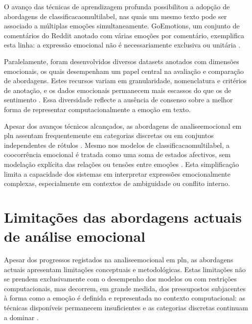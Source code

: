 O avanço das técnicas de aprendizagem profunda possibilitou a adopção de abordagens de \gls{classificacaomultilabel}, nas quais um mesmo texto pode ser associado a múltiplas emoções simultaneamente. GoEmotions, um conjunto de comentários do Reddit anotado com várias emoções por comentário, exemplifica esta linha: a expressão emocional não é necessariamente exclusiva ou unitária \parencite{Demszky2020GoEmotions}.

Paralelamente, foram desenvolvidos diversos datasets anotados com dimensões emocionais, os quais desempenham um papel central na avaliação e comparação de abordagens. Estes recursos variam em granularidade, nomenclatura e critérios de anotação, e os dados emocionais permanecem mais escassos do que os de sentimento \parencite{PlazaDelArco2024Trends, Seyeditabari2018Review}. Essa diversidade reflecte a ausência de consenso sobre a melhor forma de representar computacionalmente a emoção em texto.

Apesar dos avanços técnicos alcançados, as abordagens de \gls{analiseemocional} em \gls{pln} assentam frequentemente em categorias discretas ou em conjuntos independentes de rótulos \parencite{PlazaDelArco2024Trends, Seyeditabari2018Review}. Mesmo nos modelos de \gls{classificacaomultilabel}, a coocorrência emocional é tratada como uma soma de estados afectivos, sem modelação explícita das relações ou tensões entre emoções \parencite{Singh2026MultiEmotionIntensity, Zhao2026MEGE}. Esta simplificação limita a capacidade dos sistemas em interpretar expressões emocionalmente complexas, especialmente em contextos de ambiguidade ou conflito interno.


\section{Limitações das abordagens actuais de análise emocional}
\label{sec:limitacoes}

Apesar dos progressos registados na \gls{analiseemocional} em \gls{pln}, as abordagens actuais apresentam limitações conceptuais e metodológicas. Estas limitações não se prendem exclusivamente com o desempenho dos modelos ou com restrições computacionais, mas decorrem, em grande medida, dos pressupostos subjacentes à forma como a emoção é definida e representada no contexto computacional: as técnicas disponíveis permanecem insuficientes e as categorias discretas continuam a dominar \parencite{Seyeditabari2018Review, PlazaDelArco2024Trends}.

